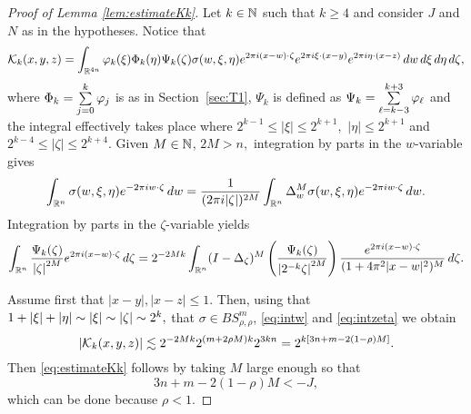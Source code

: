 \begin{proof}[Proof of Lemma \ref{lem:estimateKk}] Let $k\in\mathbb{N}$ such that $k\ge 4$ and consider $J$ and $N$ as in the hypotheses. Notice that 
\begin{align*}
 \mathcal{K}_k(x,y,z) = \int_{\mathbb{R}^{4n}} \varphi_k(\xi) \Phi_k(\eta) \Psi_k(\zeta) \sigma(w, \xi, \eta) e^{2\pi i (x-w) \cdot \zeta} e^{2\pi i \xi \cdot( x- y)} e^{2\pi i \eta \cdot(x-z)} \, dw \, d\xi \, d\eta  \, d\zeta,
\end{align*}
where $\Phi_k= \sum\limits_{j=0}^k \varphi_j$  is as in Section~\ref{sec:T1},  $\Psi_k$ is defined as $\Psi_k= \sum\limits_{\ell =k-3}^{k+3}\varphi_\ell$  and the integral effectively takes place where $2^{k-1} \leq |\xi| \leq 2^{k+1},$   $|\eta| \leq 2^{k+1}$ and  $2^{k-4} \leq |\zeta| \leq 2^{k+4}$. Given $M \in \mathbb{N}$, $2M>n,$ integration by parts in the $w$-variable gives 
\begin{equation}\label{eq:intw}
\int_{{{\mathbb R}^n}} \sigma(w, \xi, \eta) e^{-2\pi i w \cdot \zeta} \, dw =  \frac{1}{(2\pi i|\zeta|)^{2M}} \int_{{{\mathbb R}^n}} \Delta_w^M \sigma(w, \xi, \eta) e^{-2\pi i w \cdot \zeta} \, dw.
\end{equation}
  Integration by parts in the $\zeta$-variable yields
\begin{equation}\label{eq:intzeta}
\int_{{{\mathbb R}^n}}  \frac{\Psi_k(\zeta)}{\left\vert \zeta \right\vert^{2M}} e^{2\pi i (x-w) \cdot \zeta} \, d\zeta = 2^{-2Mk}\int_{{{\mathbb R}^n}} (I - \Delta_\zeta)^M \left(\frac{\Psi_k(\zeta)}{\left\vert 2^{-k}\zeta \right\vert^{2M}}\right)  \frac{e^{2\pi i (x-w) \cdot \zeta}}{(1 + 4\pi^2|x - w|^2)^M} \, d\zeta.
\end{equation}

Assume first that $|x-y|, |x-z| \leq 1$. Then, using that  $1+\left\vert \xi \right\vert+\left\vert \eta \right\vert\sim \left\vert \xi \right\vert\sim \left\vert \zeta \right\vert \sim 2^k,$ that $\sigma \in BS^m_{\rho, \rho}$,  \eqref{eq:intw} and \eqref{eq:intzeta} we obtain
$$
|\mathcal{K}_k(x,y,z)| \lesssim 2^{-2Mk} 2^{(m+ 2\rho M) k} 2^{3kn} = 2^{k [3n + m - 2 (1-\rho) M]}.
$$
 Then \eqref{eq:estimateKk} follows by taking $M$ large enough so that
\begin{equation}\label{cond:M:J}
3n +m- 2 (1-\rho)M < - J,
\end{equation}
which can be done because $\rho < 1$.


\end{proof}
